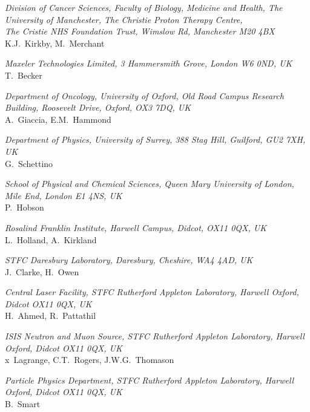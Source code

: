 \vspace{0.5cm}
\noindent \textit{Division of Cancer Sciences, Faculty of Biology, Medicine and Health, The University of Manchester, The Christie Proton Therapy Centre, \\ \> The Cristie NHS Foundation Trust, Wimslow Rd, Manchester M20 4BX} \\
K.J.~Kirkby, M.~Merchant
 
\vspace{0.5cm}
\noindent \textit{Maxeler Technologies Limited, 3 Hammersmith Grove, London W6 0ND, UK} \\
T.~Becker
 
\vspace{0.5cm}
\noindent \textit{Department of Oncology, University of Oxford, Old Road Campus Research Building, Roosevelt Drive, Oxford, OX3 7DQ, UK} \\
A.~Giaccia, E.M.~Hammond
 
\vspace{0.5cm}
\noindent \textit{Department of Physics, University of Surrey, 388 Stag Hill, Guilford, GU2 7XH, UK} \\
G.~Schettino
 
\vspace{0.5cm}
\noindent \textit{School of Physical and Chemical Sciences, Queen Mary University of London, Mile End, London E1 4NS, UK} \\
P.~Hobson
 
\vspace{0.5cm}
\noindent \textit{Rosalind Franklin Institute, Harwell Campus, Didcot, OX11 0QX, UK} \\
L.~Holland, A.~Kirkland
 
\vspace{0.5cm}
\noindent \textit{STFC Daresbury Laboratory, Daresbury, Cheshire, WA4 4AD, UK} \\
J.~Clarke, H.~Owen
 
\vspace{0.5cm}
\noindent \textit{Central Laser Facility, STFC Rutherford Appleton Laboratory, Harwell Oxford, Didcot OX11 0QX, UK} \\
H.~Ahmed, R.~Pattathil
 
\vspace{0.5cm}
\noindent \textit{ISIS Neutron and Muon Source, STFC Rutherford Appleton Laboratory, Harwell Oxford, Didcot OX11 0QX, UK} \\
x~Lagrange, C.T.~Rogers, J.W.G.~Thomason
 
\vspace{0.5cm}
\noindent \textit{Particle Physics Department, STFC Rutherford Appleton Laboratory, Harwell Oxford, Didcot OX11 0QX, UK} \\
B.~Smart
 
